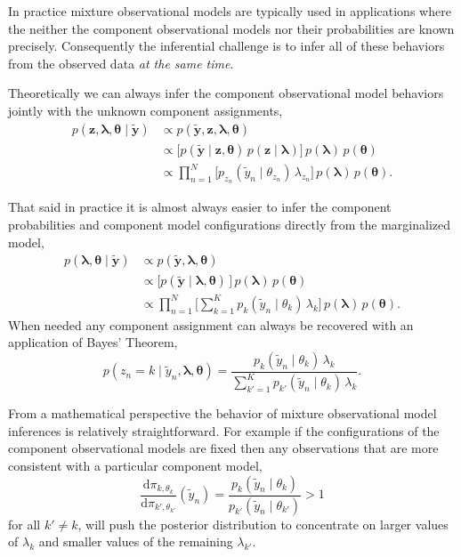 \documentclass[
  letterpaper,
  DIV=11,
  numbers=noendperiod]{scrartcl}
\begin{document}
In practice mixture observational models are typically used in
applications where the neither the component observational models nor
their probabilities are known precisely. Consequently the inferential
challenge is to infer all of these behaviors from the observed data
\emph{at the same time}.

Theoretically we can always infer the component observational model
behaviors jointly with the unknown component assignments, \begin{align*}
p(\mathbf{z}, \boldsymbol{\lambda}, \boldsymbol{\theta}
 \mid \tilde{\mathbf{y}} )
&\propto
p(\tilde{\mathbf{y}}, \mathbf{z},
  \boldsymbol{\lambda}, \boldsymbol{\theta} )
\\
&\propto
\bigg[
p(\tilde{\mathbf{y}} \mid \mathbf{z}, \boldsymbol{\theta} ) \,
p( \mathbf{z} \mid \boldsymbol{\lambda} )
\bigg] \,
p( \boldsymbol{\lambda} ) \, p( \boldsymbol{\theta} )
\\
&\propto
\prod_{n = 1}^{N} \bigg[
p_{z_{n}}(\tilde{y}_{n} \mid \theta_{z_{n}} ) \, \lambda_{z_{n}}
\bigg] \,
p( \boldsymbol{\lambda} ) \, p( \boldsymbol{\theta} ).
\end{align*}

That said in practice it is almost always easier to infer the component
probabilities and component model configurations directly from the
marginalized model, \begin{align*}
p(\boldsymbol{\lambda}, \boldsymbol{\theta}
 \mid \tilde{\mathbf{y}} )
&\propto
p(\tilde{\mathbf{y}}, \boldsymbol{\lambda}, \boldsymbol{\theta} )
\\
&\propto
\bigg[
p(\tilde{\mathbf{y}} \mid \boldsymbol{\lambda}, \boldsymbol{\theta} ) \,
\bigg] \,
p( \boldsymbol{\lambda} ) \, p( \boldsymbol{\theta} )
\\
&\propto
\prod_{n = 1}^{N} \bigg[ \sum_{k = 1}^{K}
p_{k}(\tilde{y}_{n} \mid \theta_{k} ) \, \lambda_{k}
\bigg] \,
p( \boldsymbol{\lambda} ) \, p( \boldsymbol{\theta} ).
\end{align*} When needed any component assignment can always be
recovered with an application of Bayes' Theorem, \[
p(z_{n} = k \mid
  \tilde{y}_{n}, \boldsymbol{\lambda}, \boldsymbol{\theta})
=
\frac{
p_{k}(\tilde{y}_{n} \mid \theta_{k}) \, \lambda_{k}
}{
\sum_{k' = 1}^{K} p_{k'}(\tilde{y}_{n} \mid \theta_{k}) \, \lambda_{k}
}.
\]

From a mathematical perspective the behavior of mixture observational
model inferences is relatively straightforward. For example if the
configurations of the component observational models are fixed then any
observations that are more consistent with a particular component model,
\[
\frac
{ \mathrm{d} \pi_{k , \theta_{k}}  }
{ \mathrm{d} \pi_{k', \theta_{k'}} } (\tilde{y}_{n})
=
\frac
{ p_{k}(\tilde{y}_{n} \mid \theta_{k}) }
{ p_{k'}(\tilde{y}_{n} \mid \theta_{k'}) }
> 1
\] for all \(k' \ne k\), will push the posterior distribution to
concentrate on larger values of \(\lambda_{k}\) and smaller values of
the remaining \(\lambda_{k'}\).
\end{document}
